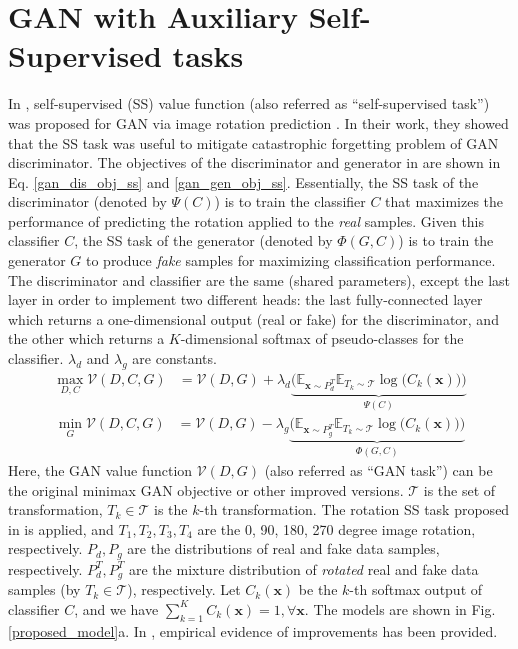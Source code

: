 \documentclass{article}
\begin{document}
 
\section{GAN with Auxiliary Self-Supervised tasks}

In \cite{chen-arxiv-2018}, self-supervised (SS) value function (also referred as ``self-supervised task'') was proposed for GAN \cite{goodfellow-nisp-2014} via image rotation prediction \cite{gidaris-iclr-2018}. 
In their work, they showed that the SS task was useful to mitigate catastrophic forgetting problem of GAN discriminator. The objectives of the discriminator and generator in \cite{chen-arxiv-2018} are shown in Eq. \ref{gan_dis_obj_ss} and \ref{gan_gen_obj_ss}. Essentially, the SS task of the discriminator (denoted by $\Psi(C)$) is to train the classifier $C$ that maximizes the performance of predicting 
the rotation applied to the {\em real} samples.
Given this classifier $C$, 
the SS task of the generator (denoted by $\Phi(G,C)$) is to train the generator $G$ to produce {\em fake} samples for maximizing classification performance. The discriminator and classifier are the same (shared parameters), except the last layer in order to implement  two different heads: the last fully-connected layer which returns a one-dimensional output (real or fake) for the discriminator,  and the other which returns a $K$-dimensional softmax of pseudo-classes for the classifier. $\lambda_d$ and $\lambda_g$ are constants.
\begin{equation}
\begin{split}
\max_{D,C}\mathcal{V}(D,C,G) &= \mathcal{V}(D,G) + \lambda_d \underbrace{\bigg(\mathbb{E}_{\mathbf{x} \sim {P_d^T}} \mathbb{E}_{T_k \sim \mathcal{T}}\log\Big(C_k(\mathbf{x})\Big)\bigg)}_{\Psi(C)}
\end{split}
\label{gan_dis_obj_ss}
\end{equation}
\begin{equation}
\begin{split}
\min_G\mathcal{V}(D,C,G) &= \mathcal{V}(D,G) - \lambda_g \underbrace{\bigg(\mathbb{E}_{\mathbf{x} \sim {P_g^T}} \mathbb{E}_{T_k \sim \mathcal{T}}\log\Big(C_k(\mathbf{x})\Big)\bigg)}_{\Phi(G,C)}
\end{split}
\label{gan_gen_obj_ss}
\end{equation}
Here, the GAN value function $\mathcal{V}(D,G)$ 
(also referred as ``GAN task'')
can be the original minimax GAN objective \cite{goodfellow-nisp-2014} or other improved versions.
$\mathcal{T}$ is the set of transformation, $T_k \in \mathcal{T}$ is the $k$-th transformation.
The rotation SS task proposed in \cite{gidaris-iclr-2018} is applied, and $T_1, T_2, T_3, T_4$ are the 0, 90, 180, 270 degree image rotation, respectively.
$P_d, P_g$ are the distributions of real and fake data samples, respectively.
$P_d^T, P_g^T$ are the mixture distribution of {\em rotated} real and fake data samples (by $T_k \in \mathcal{T}$), respectively.
Let $C_k(\mathbf{x})$ be the $k$-th softmax output of classifier $C$, and we have $\sum_{k=1}^{K}C_k(\mathbf{x}) = 1, \forall \mathbf{x}$. The models are shown in Fig. \ref{proposed_model}a. In \cite{chen-arxiv-2018}, empirical evidence of improvements has been provided.
\end{document}

